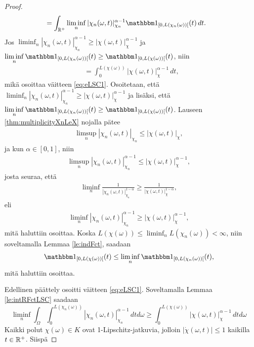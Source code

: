 \begin{proof}
\begin{align*}
        &= \int_\Rp \liminf_{n} |\chi_n(\omega, t)|_{\chi_n}^{\alpha-1} \indfct{[0, L(\chi_n(\omega))[}(t) \, dt.
    \end{align*}
    Jos $\displaystyle \liminf_n |\chi_n(\omega, t)|_{\chi_n}^{\alpha-1} \ge |\chi(\omega, t)|_{\chi}^{\alpha-1}$ ja $\displaystyle \liminf_n \indfct{[0, L(\chi_n(\omega))[}(t) \ge \indfct{[0, L(\chi(\omega))[}(t)$, niin
    \begin{align*}
        &= \int_0^{L(\chi(\omega))} |\chi(\omega, t)|_{\chi}^{\alpha-1} \, dt,
    \end{align*}
    mikä osoittaa väitteen \eqref{eq:eLSC1}. Osoitetaan, että $\displaystyle \liminf_n |\chi_n(\omega, t)|_{\chi_n}^{\alpha-1} \ge |\chi(\omega, t)|_{\chi}^{\alpha-1}$ ja lisäksi, että $\displaystyle \liminf_n \indfct{[0, L(\chi_n(\omega))[}(t) \ge \indfct{[0, L(\chi(\omega))[}(t)$.
    Lauseen \ref{thm:multiplicityXnLeX} nojalla pätee
    \begin{align*}
        \limsup_n|\chi_n(\omega, t)|_{\chi_n} \le |\chi(\omega, t)|_\chi,
    \end{align*}
    ja kun $\alpha \in [0, 1]$, niin 
    \begin{align*}
        \limsup_n|\chi_n(\omega, t)|_{\chi_n}^{\alpha-1} \le |\chi(\omega, t)|_\chi^{\alpha-1},
    \end{align*}
    josta seuraa, että
    \begin{align*}
        \liminf_n\frac{1}{|\chi_n(\omega, t)|_{\chi_n}^{1-\alpha}} \ge \frac{1}{|\chi(\omega, t)|_{\chi}^{1-\alpha}},
    \end{align*}
    eli
    \begin{align*}
        \liminf_n{|\chi_n(\omega, t)|_{\chi_n}^{\alpha-1}} \ge |\chi(\omega, t)|_{\chi}^{\alpha-1},
    \end{align*}
    mitä haluttiin osoittaa. Koska $L(\chi(\omega)) \le \liminf_n L(\chi_n(\omega)) < \infty$, niin soveltamalla Lemmaa \ref{le:indFct}, saadaan
    \begin{equation*}
        \indfct{[0, L(\chi(\omega))[}(t) \le \liminf_{n} \indfct{[0, L(\chi_n(\omega))[}(t),
    \end{equation*}
    mitä haluttiin osoittaa.
    
    Edellinen päättely osoitti väitteen \ref{eq:eLSC1}. Soveltamalla Lemmaa \ref{le:intRFctLSC} saadaan
    \begin{equation*}
        \liminf_n \int_\Omega \int_0^{L(\chi_n(\omega))}|\chi_n(\omega, t)|_{\chi_n}^{\alpha-1} \, dtd\omega\ge \int_0^{L(\chi(\omega))}|\chi(\omega, t)|_{\chi}^{\alpha-1} \, dtd\omega
    \end{equation*}
    Kaikki polut  $\chi(\omega) \in K$ ovat 1-Lipschitz-jatkuvia, jolloin $|\dot \chi(\omega, t)| \le 1$ kaikilla $t \in \mathbb{R}^+$. Siispä


\end{proof}
